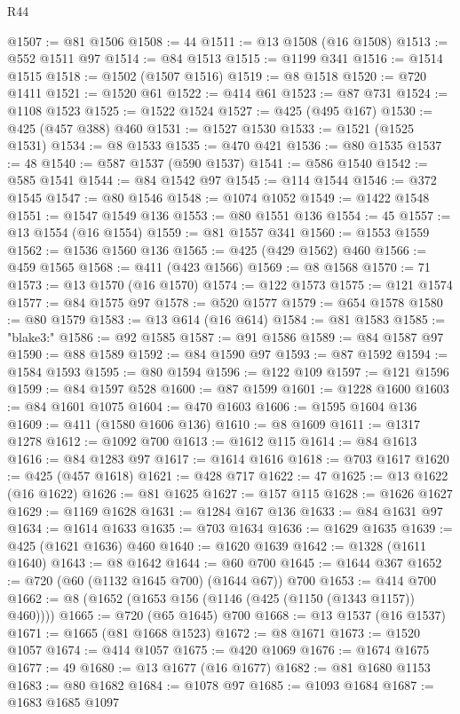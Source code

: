 \begin{lexlean}{R44}
\begin{coremodule}
@1507 := @81 @1506
@1508 := 44
@1511 := @13 @1508 (@16 @1508)
@1513 := @552 @1511 @97
@1514 := @84 @1513
@1515 := @1199 @341
@1516 := @1514 @1515
@1518 := @1502 (@1507 @1516)
@1519 := @8 @1518
@1520 := @720 @1411
@1521 := @1520 @61
@1522 := @414 @61
@1523 := @87 @731
@1524 := @1108 @1523
@1525 := @1522 @1524
@1527 := @425 (@495 @167)
@1530 := @425 (@457 @388) @460
@1531 := @1527 @1530
@1533 := @1521 (@1525 @1531)
@1534 := @8 @1533
@1535 := @470 @421
@1536 := @80 @1535
@1537 := 48
@1540 := @587 @1537 (@590 @1537)
@1541 := @586 @1540
@1542 := @585 @1541
@1544 := @84 @1542 @97
@1545 := @114 @1544
@1546 := @372 @1545
@1547 := @80 @1546
@1548 := @1074 @1052
@1549 := @1422 @1548
@1551 := @1547 @1549 @136
@1553 := @80 @1551 @136
@1554 := 45
@1557 := @13 @1554 (@16 @1554)
@1559 := @81 @1557 @341
@1560 := @1553 @1559
@1562 := @1536 @1560 @136
@1565 := @425 (@429 @1562) @460
@1566 := @459 @1565
@1568 := @411 (@423 @1566)
@1569 := @8 @1568
@1570 := 71
@1573 := @13 @1570 (@16 @1570)
@1574 := @122 @1573
@1575 := @121 @1574
@1577 := @84 @1575 @97
@1578 := @520 @1577
@1579 := @654 @1578
@1580 := @80 @1579
@1583 := @13 @614 (@16 @614)
@1584 := @81 @1583
@1585 := "blake3:"
@1586 := @92 @1585
@1587 := @91 @1586
@1589 := @84 @1587 @97
@1590 := @88 @1589
@1592 := @84 @1590 @97
@1593 := @87 @1592
@1594 := @1584 @1593
@1595 := @80 @1594
@1596 := @122 @109
@1597 := @121 @1596
@1599 := @84 @1597 @528
@1600 := @87 @1599
@1601 := @1228 @1600
@1603 := @84 @1601 @1075
@1604 := @470 @1603
@1606 := @1595 @1604 @136
@1609 := @411 (@1580 @1606 @136)
@1610 := @8 @1609
@1611 := @1317 @1278
@1612 := @1092 @700
@1613 := @1612 @115
@1614 := @84 @1613
@1616 := @84 @1283 @97
@1617 := @1614 @1616
@1618 := @703 @1617
@1620 := @425 (@457 @1618)
@1621 := @428 @717
@1622 := 47
@1625 := @13 @1622 (@16 @1622)
@1626 := @81 @1625
@1627 := @157 @115
@1628 := @1626 @1627
@1629 := @1169 @1628
@1631 := @1284 @167 @136
@1633 := @84 @1631 @97
@1634 := @1614 @1633
@1635 := @703 @1634
@1636 := @1629 @1635
@1639 := @425 (@1621 @1636) @460
@1640 := @1620 @1639
@1642 := @1328 (@1611 @1640)
@1643 := @8 @1642
@1644 := @60 @700
@1645 := @1644 @367
@1652 := @720 (@60 (@1132 @1645 @700) (@1644 @67)) @700
@1653 := @414 @700
@1662 := @8 (@1652 (@1653 @156 (@1146 (@425 (@1150 (@1343 @1157)) @460))))
@1665 := @720 (@65 @1645) @700
@1668 := @13 @1537 (@16 @1537)
@1671 := @1665 (@81 @1668 @1523)
@1672 := @8 @1671
@1673 := @1520 @1057
@1674 := @414 @1057
@1675 := @420 @1069
@1676 := @1674 @1675
@1677 := 49
@1680 := @13 @1677 (@16 @1677)
@1682 := @81 @1680 @1153
@1683 := @80 @1682
@1684 := @1078 @97
@1685 := @1093 @1684
@1687 := @1683 @1685 @1097

\end{coremodule}
\end{lexlean}
